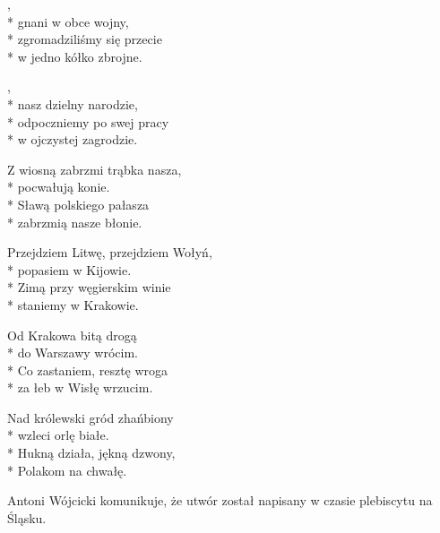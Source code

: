 \begin{lyrics}[longestline={Przejdziem Litwę, przejdziem Wołyń,}]

,\\*
gnani w obce wojny,\\*
zgromadziliśmy się przecie\\*
w jedno kółko zbrojne.

\begin{chorus}
,\\*
nasz dzielny narodzie,\\*
odpoczniemy po swej pracy\\*
w ojczystej zagrodzie.
\end{chorus}

Z wiosną zabrzmi trąbka nasza,\\*
pocwałują konie.\\*
Sławą polskiego pałasza\\*
zabrzmią nasze błonie.

\chorusref

Przejdziem Litwę, przejdziem Wołyń,\\*
popasiem w Kijowie.\\*
Zimą przy węgierskim winie\\*
staniemy w Krakowie.

\chorusref

Od Krakowa bitą drogą\\*
do Warszawy wrócim.\\*
Co zastaniem, resztę wroga\\*
za łeb w Wisłę wrzucim.

\chorusref

Nad królewski gród zhańbiony\\*
wzleci orlę białe.\\*
Hukną działa, jękną dzwony,\\*
Polakom na chwałę.

\chorusref
\end{lyrics}



\begin{info}Antoni Wójcicki komunikuje, że utwór został napisany w czasie plebiscytu na Śląsku.\end{info}

